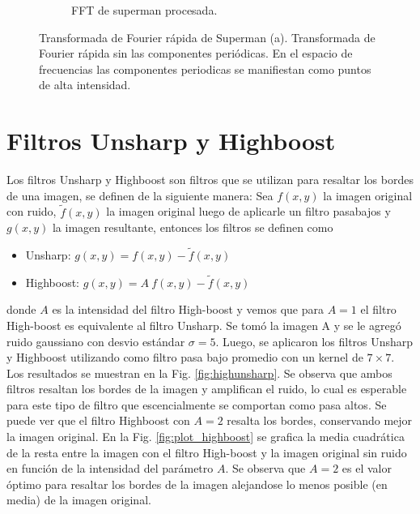 \documentclass[letterpaper,12pt]{article}
\theoremstyle{plain}
\begin{document}
\begin{figure}[h]
\begin{subfigure}[h]{0.49\linewidth}
            \caption{FFT de superman procesada.}
         \end{subfigure}
    \caption{Transformada de Fourier rápida de Superman (a). Transformada de Fourier rápida sin las componentes periódicas. En el espacio de frecuencias las componentes periodicas se manifiestan como puntos de alta intensidad.}
    \label{fig:supermanfft}
\end{figure}

\section{Filtros Unsharp y Highboost\label{sec:ej6}}

\vspace{0.3cm}

Los filtros Unsharp y Highboost son filtros que se utilizan para resaltar los bordes de una imagen, se definen de la siguiente manera: Sea $f(x,y)$ la imagen original con ruido, $\tilde{f}(x,y)$ la imagen original luego de aplicarle un filtro pasabajos y $g(x,y)$ la imagen resultante, entonces los filtros se definen como
\begin{itemize}
    \item Unsharp: $g(x,y) = f(x,y) - \tilde{f}(x,y)$
    \item Highboost: $g(x,y) = A~f(x,y) - \tilde{f}(x,y)$
\end{itemize}
donde $A$ es la intensidad del filtro High-boost y vemos que para $A=1$ el filtro High-boost es equivalente al filtro Unsharp. Se tomó la imagen A y se le agregó ruido gaussiano con desvio estándar $\sigma = 5$. Luego, se aplicaron los filtros Unsharp y Highboost utilizando como filtro pasa bajo promedio con un kernel de $7\times7$. Los resultados se muestran en la Fig. \ref{fig:highunsharp}. Se observa que ambos filtros resaltan los bordes de la imagen y amplifican el ruido, lo cual es esperable para este tipo de filtro que escencialmente se comportan como pasa altos. Se puede ver que el filtro Highboost con $A=2$ resalta los bordes, conservando mejor la imagen original. En la Fig. \ref{fig:plot_highboost} se grafica la media cuadrática de la resta entre la imagen con el filtro High-boost y la imagen original sin ruido en función de la intensidad del parámetro $A$. Se observa que $A=2$ es el valor óptimo para resaltar los bordes de la imagen alejandose lo menos posible (en media) de la imagen original.
\end{document}

